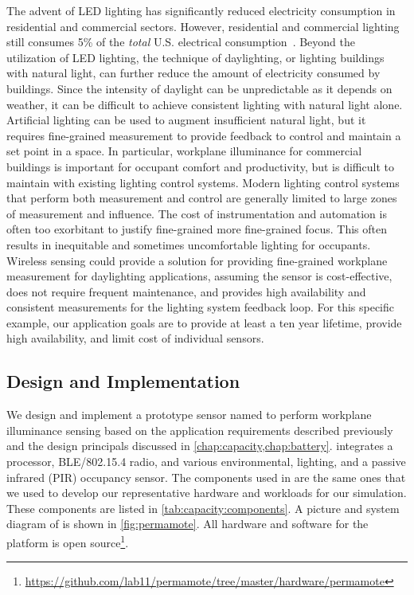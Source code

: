 The advent of LED lighting has significantly reduced electricity consumption in residential and commercial sectors. However, residential and commercial lighting still consumes 5\% of the \textit{total} U.S. electrical consumption~\cite{aeo2022}.
Beyond the utilization of LED lighting, the technique of daylighting, or lighting buildings with natural light, can further reduce the amount of electricity consumed by buildings. 
Since the intensity of daylight can be unpredictable as it depends on weather, it can be difficult to achieve consistent lighting with natural light alone.
Artificial lighting can be used to augment insufficient natural light, but it requires fine-grained measurement to provide feedback to control and maintain a set point in a space.
In particular, workplane illuminance for commercial buildings is important for occupant comfort and productivity, but is difficult to maintain with existing lighting control systems. 
Modern lighting control systems that perform both measurement and control are generally limited to large zones of measurement and influence. 
The cost of instrumentation and automation is often too exorbitant to justify fine-grained more fine-grained focus.
This often results in inequitable and sometimes uncomfortable lighting for occupants.
Wireless sensing could provide a solution for providing fine-grained workplane measurement for daylighting applications, assuming the sensor is cost-effective, does not require frequent maintenance, and provides high availability and consistent measurements for the lighting system feedback loop.
For this specific example, our application goals are to provide at least a ten year lifetime, provide high availability, and limit cost of individual sensors. 


\subsection{Design and Implementation}
We design and implement a prototype sensor named \name to perform workplane illuminance sensing based on the application requirements described previously and the design principals discussed in \cref{chap:capacity,chap:battery}.
\name integrates a processor, BLE/802.15.4 radio, and various environmental, lighting,
and a passive infrared (PIR) occupancy sensor.
The components used in \name are the same ones that we used to develop our representative hardware and workloads for our simulation. 
These components are listed in \cref{tab:capacity:components}. 
A picture
and system diagram of \name is shown in \cref{fig:permamote}. All hardware
and software for the platform is open source\footnote{\url{https://github.com/lab11/permamote/tree/master/hardware/permamote}}.

